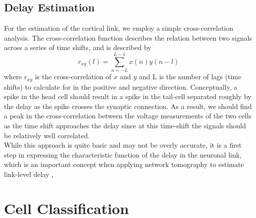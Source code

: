 \subsection{Delay Estimation}
For the estimation of the cortical link, we employ a simple cross-correlation analysis. The cross-correlation function describes the relation between two signals across a series of time shifts, and is described by
\begin{equation}
    \label{eq:xcorr}
    r_{xy}(l) = \sum_{n=-L}^{L-1}x(n)y(n-l)
\end{equation}
where $r_{xy}$ is the cross-correlation of $x$ and $y$ and L is the number of lags (time shifts) to calculate for in the positive and negative direction. Conceptually, a spike in the head cell should result in a spike in the tail-cell separated roughly by the delay as the spike crosses the synaptic connection. As a result, we should find a peak in the cross-correlation between the voltage measurements of the two cells as the time shift approaches the delay since at this time-shift the signals should be relatively well correlated.\\
While this approach is quite basic and may not be overly accurate, it is a first step in expressing the characteristic function of the delay in the neuronal link, which is an important concept when applying network tomography to estimate link-level delay \cite{netTomFour},

\section{Cell Classification}

